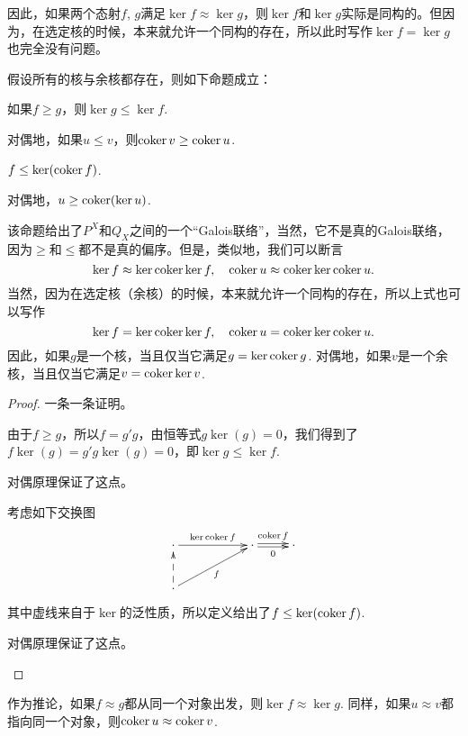 因此，如果两个态射$f$, $g$满足$\ker f\approx \ker g$，则$\ker f$和$\ker g$实际是同构的。但因为，在选定核的时候，本来就允许一个同构的存在，所以此时写作$\ker f=\ker g$也完全没有问题。

\begin{pro}\label{glgl}假设所有的核与余核都存在，则如下命题成立：
\begin{compactenum}[~~~(1)]
\item 如果$f\geq g$，则$\ker g \leq \ker f$. 
\item 对偶地，如果$u\leq v$，则$\operatorname{coker} v \geq \operatorname{coker} u$. 
\item $f\leq \ker(\operatorname{coker} f)$.
\item 对偶地，$u\geq \operatorname{coker}(\ker u)$.
\end{compactenum}
\end{pro}

该命题给出了$P^X$和$Q_X$之间的一个“Galois联络”，当然，它不是真的Galois联络，因为$\geq$和$\leq$都不是真的偏序。但是，类似地，我们可以断言
\[
	\ker f\approx \ker \operatorname{coker} \ker f,\quad \operatorname{coker} u \approx \operatorname{coker} \ker \operatorname{coker} u.
\]
当然，因为在选定核（余核）的时候，本来就允许一个同构的存在，所以上式也可以写作
\begin{equation}\label{kck}
\ker f= \ker \operatorname{coker} \ker f,\quad \operatorname{coker} u = \operatorname{coker} \ker \operatorname{coker} u.
\end{equation}
因此，如果$g$是一个核，当且仅当它满足$g=\ker \operatorname{coker} g$. 对偶地，如果$v$是一个余核，当且仅当它满足$v = \operatorname{coker} \ker v$.

\begin{proof}一条一条证明。
\begin{compactenum}[~~~(1)]
\item 由于$f\geq g$，所以$f=g'g$，由恒等式$g\ker(g)=0$，我们得到了$f\ker(g)=g'g\ker(g)=0$，即$\ker g\leq \ker f$. 
\item 对偶原理保证了这点。
\item 考虑如下交换图
\[
\begin{xy}
	\xymatrix{
	\cdot \ar[rr]^-{\ker \coker f}&&\cdot \ar@<0.3ex>[r]^-{\coker f} \ar@<-0.3ex>[r]_-{0}&\cdot \\
	\cdot \ar@{-->}[u]\ar[urr]_f
	}
\end{xy}
\]
其中虚线来自于$\ker$的泛性质，所以定义给出了$f\leq \ker(\operatorname{coker} f)$.
\item 对偶原理保证了这点。
\end{compactenum}
\end{proof}

作为推论，如果$f\approx g$都从同一个对象出发，则$\ker f\approx \ker g$. 同样，如果$u\approx v$都指向同一个对象，则$\operatorname{coker} u \approx \operatorname{coker} v$.

